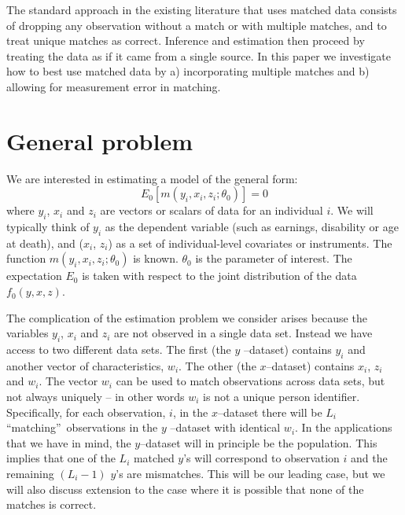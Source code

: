 \documentclass[12pt]{article}
\begin{document}
The standard approach in the existing literature that uses matched data
consists of dropping any observation without a match or with multiple
matches, and to treat unique matches as correct. Inference and estimation
then proceed by treating the data as if it came from a single source. In
this paper we investigate how to best use matched data by a) incorporating
multiple matches and b) allowing for measurement error in matching.

\section{General problem}

We are interested in estimating a model of the general form:
\begin{equation}
E_0\left[ m\left( y_{i},x_{i},z_{i};\theta _{0}\right) \right] =0
\label{Moment}
\end{equation}%
where $y_{i}$, $x_{i}$ and $z_{i}$ are vectors or scalars of data for an
individual $i$. We will typically think of $y_{i}$ as the dependent variable
(such as earnings, disability or age at death), and ($x_{i}$, $z_{i}$) as a
set of individual-level covariates or instruments. The function $m\left(
y_{i},x_{i},z_{i};\theta _{0}\right) $ is known. $\theta _{0}$ is the
parameter of interest.  The expectation $E_0$ is taken with respect to the joint distribution of the data $f_0(y,x,z)$.

The complication of the estimation problem we consider arises because the
variables $y_{i}$, $x_{i}$ and $z_{i}$ are not observed in a single data
set. Instead we have access to two different data sets. The first (the $y$%
--dataset) contains $y_{i}$ and another vector of characteristics, $w_{i}$.
The other (the $x$--dataset) contains $x_{i}$, $z_{i}$ and $w_{i}$. The
vector $w_{i}$ can be used to match observations across data sets, but not
always uniquely -- in other words $w_{i}$ is not a unique person identifier.
Specifically, for each observation, $i$, in the $x$--dataset there will be $%
L_{i}$ \textquotedblleft matching\textquotedblright\ observations in the $y$%
--dataset with identical $w_{i}$. In the applications that we have in mind,
the $y$--dataset will in principle be the population. This implies that one
of the $L_{i}$ matched $y$'s will correspond to observation $i$ and the
remaining $\left( L_{i}-1\right) $ $y$'s are mismatches. This will be our
leading case, but we will also discuss extension to the case where it is
possible that none of the matches is correct.
\end{document}

